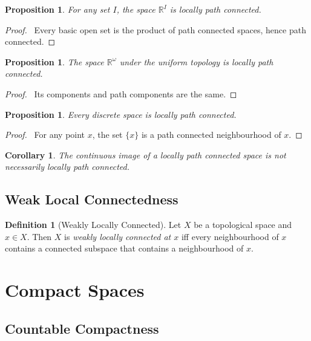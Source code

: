 \documentclass{report}
\let\qed\relax
\newtheorem{prop}[lm]{Proposition}
\newtheorem{cor}{Corollary}[lm]
\theoremstyle{definition}
\newtheorem{df}[lm]{Definition}
\begin{document}
 \begin{prop}
 	For any set $I$,
   the space $\mathbb{R}^I$ is locally path connected.
 \end{prop}

 \begin{proof}
  \pf\ Every basic open set is the product of path connected spaces, hence path
connected. \qed
 \end{proof}

 \begin{prop}
   The space $\mathbb{R}^\omega$ under the uniform topology is locally path
connected.
 \end{prop}

 \begin{proof}
  \pf\ Its components and path components are the same. \qed
 \end{proof}

 \begin{prop}
   Every discrete space is locally path connected.
 \end{prop}

 \begin{proof}
   \pf\ For any point $x$, the set $\{x\}$ is a path connected neighbourhood of $x$. \qed
 \end{proof}

 \begin{cor}
   The continuous image of a locally path connected space is not necessarily locally path connected.
 \end{cor}


 \section{Weak Local Connectedness}


  \begin{df}[Weakly Locally Connected]
    Let $X$ be a topological space and $x \in X$. Then $X$ is \emph{weakly
      locally connected at $x$} iff every neighbourhood of $x$ contains a
    connected subspace that contains a neighbourhood of $x$.
  \end{df}

  \chapter{Compact Spaces}

  \section{Countable Compactness}
\end{document}
